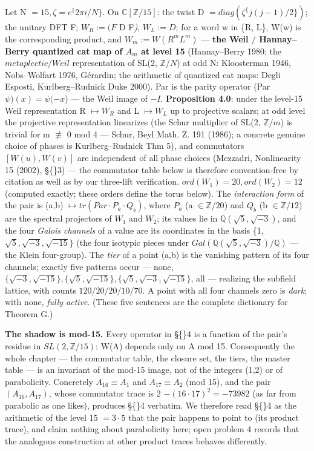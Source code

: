 \documentclass[11pt]{article}
\theoremstyle{plain}
\theoremstyle{definition}
\theoremstyle{remark}
\begin{document}
Let N \(= 15, \zeta  = e^\{2\pi i/N\}\). On \(\mathbb{C}[\mathbb{Z}/15]\): the twist D \(= diag(\zeta ^\{j(j-1)/2\})\); the unitary DFT F; \(W_{R} := (F\) D F\emph{)}, \(W_{L} := D\); for a word w in \{R, L\}, W(w) is the corresponding product, and \(W_{m} := W(R^{m} L^{m})\) — \textbf{the Weil \(/\) Hannay–Berry quantized cat map of \(A_{m}\) at level 15} (Hannay–Berry 1980; the \(metaplectic/Weil\) representation of SL(2, \(\mathbb{Z}/N\)) at odd N: Kloosterman 1946, Nobs–Wolfart 1976, Gérardin; the arithmetic of quantized cat maps: Degli Esposti, Kurlberg–Rudnick Duke 2000). Par is the parity operator (Par \(\psi )(x) = \psi (-x\)) — the Weil image of \(-I\). \textbf{Proposition 4.0}: under the level-15 Weil representation R \(\mapsto  W_{R}\) and L \(\mapsto  W_{L}\) up to projective scalars; at odd level the projective representation linearizes (the Schur multiplier of SL(2, \(\mathbb{Z}/m\)) is trivial for m \(\not\equiv \) 0 mod 4 — Schur, Beyl Math. Z. 191 (1986); a concrete genuine choice of phases is Kurlberg–Rudnick Thm 5), and commutators \([W(u), W(v)]\) are independent of all phase choices (Mezzadri, Nonlinearity 15 (2002), \S\{\}3) — the commutator table below is therefore convention-free by citation as well as by our three-lift verification. \(ord(W_{1}) = 20, ord(W_{2}) = 12\) (computed exactly; these orders define the torus below). The \emph{interaction form} of the pair is (a,b) \(\mapsto  tr(Par\cdot P_{a}\cdot Q_{b})\), where \(P_{a}\) (a \(\in  \mathbb{Z}/20\)) and \(Q_{b}\) (b \(\in  \mathbb{Z}/12\)) are the spectral projectors of \(W_{1}\) and \(W_{2}\); its values lie in \(\mathbb{Q}(\sqrt{5}, \sqrt{-3})\), and the four \emph{Galois channels} of a value are its coordinates in the basis \{1, \(\sqrt{5}, \sqrt{-3}, \sqrt{-15}\}\) (the four isotypic pieces under \(Gal(\mathbb{Q}(\sqrt{5},\sqrt{-3})/\mathbb{Q})\) — the Klein four-group). The \emph{tier} of a point (a,b) is the vanishing pattern of its four channels; exactly five patterns occur — none, \(\{\sqrt{-3},\sqrt{-15}\}, \{\sqrt{5},\sqrt{-15}\}, \{\sqrt{5},\sqrt{-3},\sqrt{-15}\}\), all — realizing the subfield lattice, with counts \(120/20/20/10/70\). A point with all four channels zero is \emph{dark}; with none, \emph{fully active}. (These five sentences are the complete dictionary for Theorem G.)

\textbf{The shadow is mod-15.} Every operator in \S\{\}4 is a function of the pair's residue in \(SL(2,\mathbb{Z}/15)\): W(A) depends only on A mod 15. Consequently the whole chapter — the commutator table, the closure set, the tiers, the master table — is an invariant of the mod-15 image, not of the integers (1,2) or of parabolicity. Concretely \(A_{16} \equiv  A_{1}\) and \(A_{17} \equiv  A_{2}\) (mod 15), and the pair \((A_{16}, A_{17})\), whose commutator trace is 2 \(- (16\cdot 17)^{2} = -73982\) (as far from parabolic as one likes), produces \S\{\}4 verbatim. We therefore read \S\{\}4 as the arithmetic of the level 15 \(= 3\cdot 5\) that the pair happens to point to (its product trace), and claim nothing about parabolicity here; open problem 4 records that the analogous construction at other product traces behaves differently.
\end{document}

